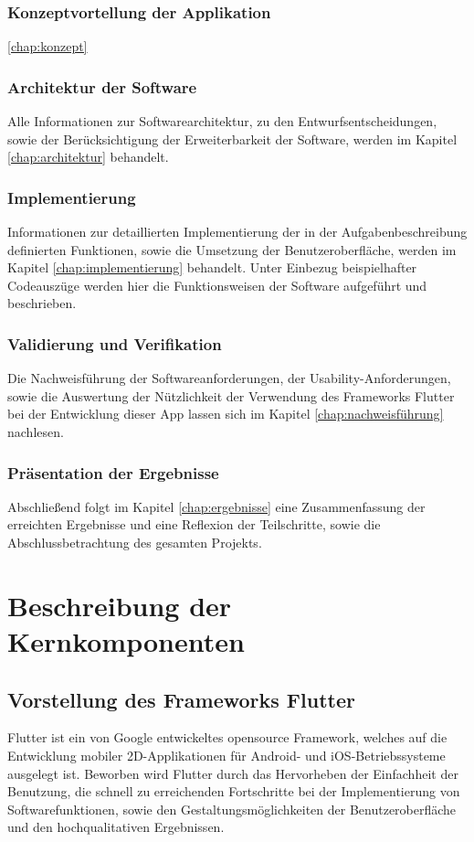 \documentclass{scrreprt}
\begin{document}
\subsection{Konzeptvortellung der Applikation}
\par \ref{chap:konzept}


\subsection{Architektur der Software}
\par Alle Informationen zur Softwarearchitektur, zu den Entwurfsentscheidungen, sowie der Berücksichtigung der Erweiterbarkeit der Software, werden im Kapitel \ref{chap:architektur}  behandelt.

\subsection{Implementierung}
Informationen zur detaillierten Implementierung der in der Aufgabenbeschreibung definierten Funktionen, sowie die Umsetzung der Benutzeroberfläche, werden im Kapitel \ref{chap:implementierung} behandelt. Unter Einbezug beispielhafter Codeauszüge werden hier die Funktionsweisen der Software aufgeführt und beschrieben.

\subsection{Validierung und Verifikation}
Die Nachweisführung der Softwareanforderungen, der Usability-Anforderungen, sowie die Auswertung der Nützlichkeit der Verwendung des Frameworks Flutter bei der Entwicklung dieser App lassen sich im Kapitel \ref{chap:nachweisführung} nachlesen.

\subsection{Präsentation der Ergebnisse}
Abschließend folgt im Kapitel \ref{chap:ergebnisse} eine Zusammenfassung der erreichten Ergebnisse und eine Reflexion der Teilschritte, sowie die Abschlussbetrachtung des gesamten Projekts.


\chapter{Beschreibung der Kernkomponenten} \label{chap:grundlagenkapitel}

\section{Vorstellung des Frameworks Flutter}
Flutter ist ein von Google entwickeltes opensource Framework, welches auf die Entwicklung mobiler 2D-Applikationen für Android- und iOS-Betriebssysteme ausgelegt ist. Beworben wird Flutter durch das Hervorheben der Einfachheit der Benutzung, die schnell zu erreichenden Fortschritte bei der Implementierung von Softwarefunktionen, sowie den Gestaltungsmöglichkeiten der Benutzeroberfläche und den hochqualitativen Ergebnissen.
\end{document}
